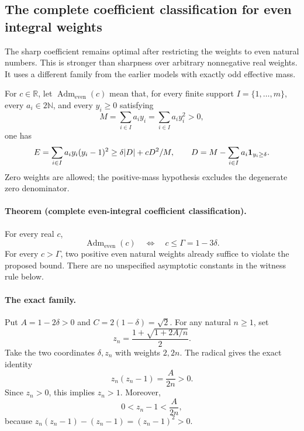 \subsection{The complete coefficient classification for even integral weights}
\label{sec:even-integral-parity}

The sharp coefficient remains optimal after restricting the weights to
even natural numbers.  This is stronger than sharpness over arbitrary
nonnegative real weights.  It uses a different family from the earlier
models with exactly odd effective mass.

For \(c\in\mathbb R\), let \(\operatorname{Adm}_{\mathrm{even}}(c)\)
mean that, for every finite support \(I=\{1,\ldots,m\}\), every
\(a_i\in2\mathbb N\), and every \(y_i\ge0\) satisfying
\[
 M=\sum_{i\in I}a_i y_i=\sum_{i\in I}a_i y_i^2>0,
\]
one has
\[
 E=\sum_{i\in I}a_i y_i(y_i-1)^2
 \ge \delta|D|+cD^2/M,\qquad
 D=M-\sum_{i\in I}a_i{\bf1}_{y_i\ge\delta}.
\]
Zero weights are allowed; the positive-mass hypothesis excludes the
degenerate zero denominator.

\paragraph{Theorem (complete even-integral coefficient classification).}
For every real \(c\),
\begin{equation}\label{eq:even-integral-classification}
 \operatorname{Adm}_{\mathrm{even}}(c)
 \quad\Longleftrightarrow\quad c\le\Gamma=1-3\delta.
\end{equation}
For every \(c>\Gamma\), two positive even natural weights already suffice
to violate the proposed bound.  There are no unspecified asymptotic
constants in the witness rule below.

\paragraph{The exact family.}
Put \(A=1-2\delta>0\) and \(C=2(1-\delta)=\sqrt2\).
For any natural \(n\ge1\), set
\[
 z_n=\frac{1+\sqrt{1+2A/n}}2.
\]
Take the two coordinates \(\delta,z_n\) with weights \(2,2n\).
The radical gives the exact identity
\[
 z_n(z_n-1)=\frac A{2n}>0.
\]
Since \(z_n>0\), this implies \(z_n>1\).
Moreover,
\begin{equation}\label{eq:even-integral-excess}
 0<z_n-1<\frac A{2n},
\end{equation}
because \(z_n(z_n-1)-(z_n-1)=(z_n-1)^2>0\).

